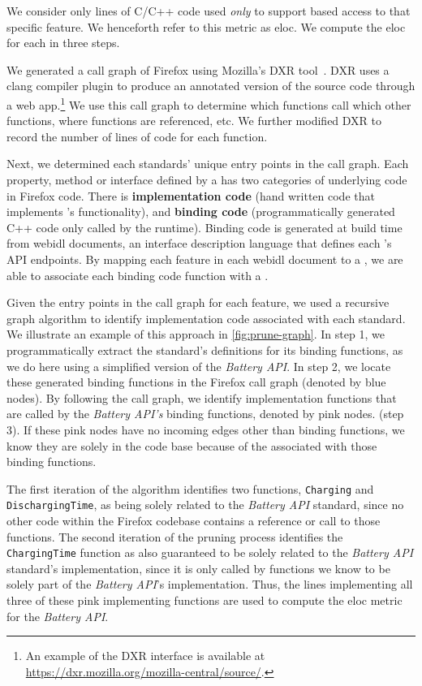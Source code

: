 We consider only lines of C/C++ code used \emph{only} to support \JS based access to that specific feature.
We henceforth refer to this metric as \gls{eloc}.
We compute the \gls{eloc} for each \WAS in three steps.

We generated a call graph of Firefox using Mozilla's DXR tool~\cite{dxr}.  DXR uses a clang compiler plugin to produce an
annotated version of the source code through a web app.\footnote{An example of the DXR interface is available at
\url{https://dxr.mozilla.org/mozilla-central/source/}.} We use this call graph
to determine which functions call which other functions, where functions are referenced, etc.
We further modified DXR to record the number of lines of code for each function.

Next, we determined each standards' unique entry points in the call graph.
Each property, method or interface defined by a \WAS has two categories of
underlying code in Firefox code.  There is
\textbf{implementation code} (hand written code that implements \WAS's
functionality), and \textbf{binding code} (programmatically generated C++ code
only called by the \JS runtime).  Binding code is generated at build time
from \gls{webidl} documents, an interface description language that defines each \WAS's
\JS API endpoints. By mapping each feature in each \gls{webidl} document to a \WAS,
we are able to associate each binding code function with a \WAS.



Given the entry points in the call graph for each \WAPI feature, we used a
recursive graph algorithm to identify implementation code
associated with each standard. We
illustrate an example of this approach in
\ref{fig:prune-graph}.  In step 1, we programmatically extract the
standard's definitions for its binding functions, as we do here using a
simplified version of  the \textit{Battery API}. In step 2, we locate these
generated binding functions in the Firefox call graph (denoted by blue nodes).
By following the call graph, we identify implementation functions that are
called by the \textit{Battery API's} binding functions, denoted by pink nodes.
(step 3). If these pink nodes have no incoming edges other than binding functions, we
know they are solely in the code base because of the \WAS associated with
those binding functions.

The first iteration of the algorithm identifies two functions,
\texttt{Charging} and \texttt{DischargingTime}, as being
solely related to the \textit{Battery API} standard, since no
other code within the Firefox codebase contains a reference or call to those
functions.  The second iteration of the pruning process identifies the
\texttt{ChargingTime} function as also guaranteed to be solely related to the
\textit{Battery API} standard's implementation, since it is only called by
functions we know to be solely part of the \textit{Battery API}'s
implementation. Thus, the lines implementing all three of these pink
implementing functions are used to compute the \gls{eloc} metric for the
\textit{Battery API}.


